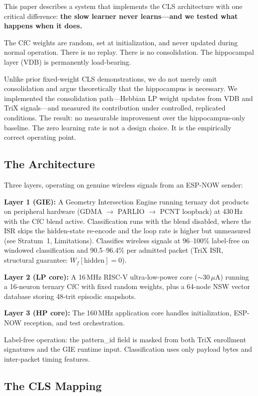 \documentclass[11pt,letterpaper]{article}
\begin{document}
This paper describes a system that implements the CLS architecture with one critical difference: \textbf{the slow learner never learns---and we tested what happens when it does.}

The CfC weights are random, set at initialization, and never updated during normal operation. There is no replay. There is no consolidation. The hippocampal layer (VDB) is permanently load-bearing.

Unlike prior fixed-weight CLS demonstrations, we do not merely omit consolidation and argue theoretically that the hippocampus is necessary. We implemented the consolidation path---Hebbian LP weight updates from VDB and TriX signals---and measured its contribution under controlled, replicated conditions. The result: no measurable improvement over the hippocampus-only baseline. The zero learning rate is not a design choice. It is the empirically correct operating point.

\subsection{The Architecture}

Three layers, operating on genuine wireless signals from an ESP-NOW sender:

\textbf{Layer 1 (GIE):} A Geometry Intersection Engine running ternary dot products on peripheral hardware (GDMA $\to$ PARLIO $\to$ PCNT loopback) at 430\,Hz with the CfC blend active. Classification runs with the blend disabled, where the ISR skips the hidden-state re-encode and the loop rate is higher but unmeasured (see Stratum~1, Limitations). Classifies wireless signals at 96--100\% label-free on windowed classification and 90.5--96.4\% per admitted packet (TriX ISR, structural guarantee: $W_f[\text{hidden}] = 0$).

\textbf{Layer 2 (LP core):} A 16\,MHz RISC-V ultra-low-power core ($\sim$30\,$\mu$A) running a 16-neuron ternary CfC with fixed random weights, plus a 64-node NSW vector database storing 48-trit episodic snapshots.

\textbf{Layer 3 (HP core):} The 160\,MHz application core handles initialization, ESP-NOW reception, and test orchestration.

Label-free operation: the pattern\_id field is masked from both TriX enrollment signatures and the GIE runtime input. Classification uses only payload bytes and inter-packet timing features.

\subsection{The CLS Mapping}
\end{document}
